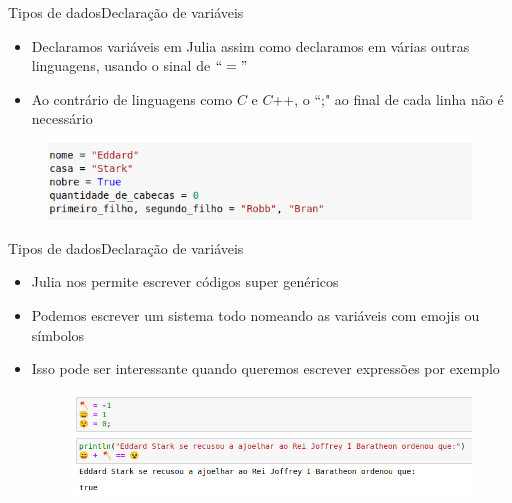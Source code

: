 \documentclass{beamer}
\begin{document}
\begin{frame}{Tipos de dados}{Declaração de variáveis}
    \begin{itemize}
        \item Declaramos variáveis em Julia assim como declaramos em várias outras linguagens, usando o sinal de $``="$
        \item Ao contrário de linguagens como $C$ e $C$++, o ``;"  ao final de cada linha não é necessário
    \end{itemize}
    \begin{figure}
        \centering
        \includegraphics[scale=0.5]{imagens/declaracao-de-variaveis.png}
        \label{fig:declaracao-de-variaveis}
    \end{figure}
\end{frame}

\begin{frame}{Tipos de dados}{Declaração de variáveis}
    \begin{itemize}
        \item Julia nos permite escrever códigos super genéricos
        \item Podemos escrever um sistema todo nomeando as variáveis com emojis ou símbolos
        \item Isso pode ser interessante quando queremos escrever expressões por exemplo
        \begin{figure}
            \centering
            \includegraphics[scale=0.4]{imagens/ex-codigo-neutro.png}
            \label{fig:ex-tipos}
        \end{figure}
    \end{itemize}

\end{frame}
\end{document}
